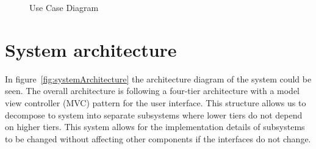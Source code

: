 \begin{figure}
	\caption{Use Case Diagram}
\label{fig:useCase}
\end{figure}

\FloatBarrier
\section{System architecture}
In figure~\ref{fig:systemArchitecture} the architecture diagram of the system could be seen. The overall architecture is following a four-tier architecture with a model view controller (MVC) pattern for the user interface. This structure allows us to decompose to system into separate subsystems where lower tiers do not depend on higher tiers. This system allows for the implementation details of subsystems to be changed without affecting other components if the interfaces do not change.

